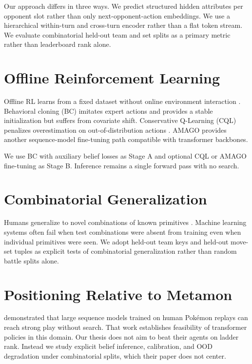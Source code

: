 Our approach differs in three ways. We predict structured hidden attributes per
opponent slot rather than only next-opponent-action embeddings. We use a
hierarchical within-turn and cross-turn encoder rather than a flat token
stream. We evaluate combinatorial held-out team and set splits as a primary
metric rather than leaderboard rank alone.

\section{Offline Reinforcement Learning}

Offline RL learns from a fixed dataset without online environment interaction
\citep{sutton2018reinforcement}. Behavioral cloning (BC) imitates expert actions
and provides a stable initialization but suffers from covariate shift.
Conservative Q-Learning (CQL) penalizes overestimation on out-of-distribution
actions \citep{kumar2020conservative}. AMAGO provides another sequence-model
fine-tuning path compatible with transformer backbones.

We use BC with auxiliary belief losses as Stage A and optional CQL or AMAGO
fine-tuning as Stage B. Inference remains a single forward pass with no search.

\section{Combinatorial Generalization}

Humans generalize to novel combinations of known primitives
\citep{lake2018building}. Machine learning systems often fail when test
combinations were absent from training even when individual primitives were
seen. We adopt held-out team keys and held-out move-set tuples as explicit
tests of combinatorial generalization rather than random battle splits alone.

\section{Positioning Relative to Metamon}

\citet{grigsby2025metamon} demonstrated that large sequence models trained on
human Pok\'emon replays can reach strong play without search. That work
establishes feasibility of transformer policies in this domain. Our thesis does
not aim to beat their agents on ladder rank. Instead we study explicit belief
inference, calibration, and OOD degradation under combinatorial splits, which
their paper does not center.
